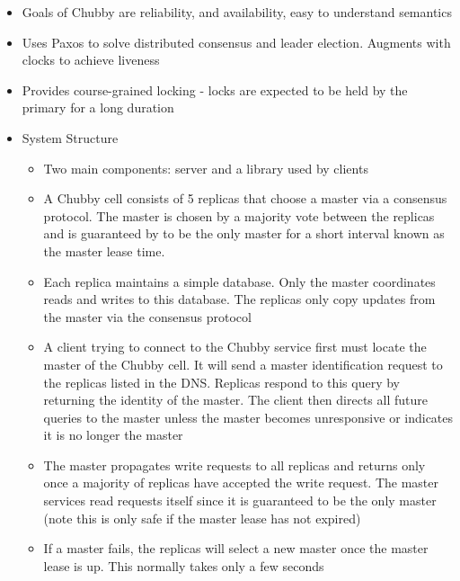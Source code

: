 \documentclass[a4paper]{article}
\begin{document}
\begin{itemize}
\item Goals of Chubby are reliability, and availability, easy to understand semantics

\item Uses Paxos to solve distributed consensus and leader election. Augments with clocks to achieve liveness

\item Provides course-grained locking - locks are expected to be held by the primary for a long duration

\item System Structure
\begin{itemize}
\item Two main components: server and a library used by clients

\item A Chubby cell consists of 5 replicas that choose a master via a consensus protocol. The master is chosen by a majority vote between the replicas and is guaranteed by to be the only master for a short interval known as the master lease time.

\item Each replica maintains a simple database. Only the master coordinates reads and writes to this database. The replicas only copy updates from the master via the consensus protocol

\item A client trying to connect to the Chubby service first must locate the master of the Chubby cell. It will send a master identification request to the replicas listed in the DNS. Replicas respond to this query by returning the identity of the master. The client then directs all future queries to the master unless the master becomes unresponsive or indicates it is no longer the master

\item The master propagates write requests to all replicas and returns only once a majority of replicas have accepted the write request. The master services read requests itself since it is guaranteed to be the only master (note this is only safe if the master lease has not expired)

\item If a master fails, the replicas will select a new master once the master lease is up. This normally takes only a few seconds


\end{itemize}
\end{itemize}
\end{document}
